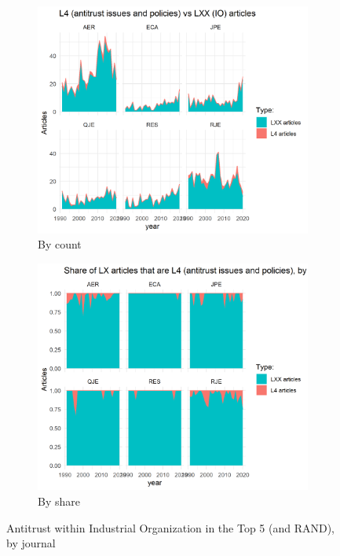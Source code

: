 \documentclass[11pt, letterpaper, twoside]{article}
\begin{document}
\begin{figure}[!ht]
    \begin{subfigure}[h]{0.49\textwidth}
        \centering
        \includegraphics[width=\textwidth]{L4-vs-LXX-by-journal.png}
        \caption{By count}
    \end{subfigure}
    \hfill
    \begin{subfigure}[h]{0.49\textwidth}
        \centering
        \includegraphics[width=\textwidth]{L4-vs-LXX-normalized-by_journal.png}
        \caption{By share}
    \end{subfigure}
    \caption{Antitrust within Industrial Organization in the Top 5 (and RAND), by journal}
\end{figure}
\end{document}
